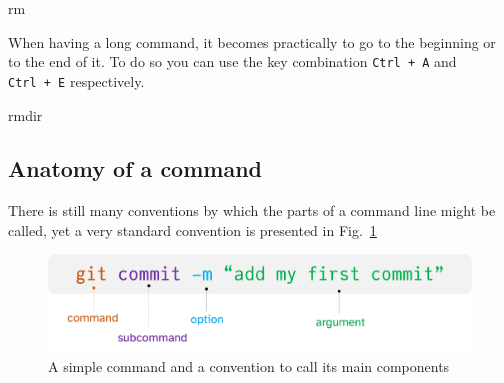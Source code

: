 \documentclass[
  letterpaper,
  DIV=11,
  numbers=noendperiod,
  oneside]{scrreprt}
\newenvironment{Shaded}{\begin{snugshade}}{\end{snugshade}}
\newcommand{\FunctionTok}[1]{\textcolor[rgb]{0.28,0.35,0.67}{#1}}
\begin{document}
\begin{Shaded}
\begin{Highlighting}[]
\FunctionTok{rm}
\end{Highlighting}
\end{Shaded}

\begin{tcolorbox}[enhanced jigsaw, opacityback=0, leftrule=.75mm, breakable, titlerule=0mm, toprule=.15mm, rightrule=.15mm, title=\textcolor{quarto-callout-tip-color}{\faLightbulb}\hspace{0.5em}{Tip}, colback=white, opacitybacktitle=0.6, toptitle=1mm, bottomtitle=1mm, colframe=quarto-callout-tip-color-frame, colbacktitle=quarto-callout-tip-color!10!white, arc=.35mm, coltitle=black, bottomrule=.15mm, left=2mm]
When having a long command, it becomes practically to go to the
beginning or to the end of it. To do so you can use the key combination
\texttt{Ctrl\ +\ A} and \texttt{Ctrl\ +\ E} respectively.
\end{tcolorbox}

\begin{Shaded}
\begin{Highlighting}[]
\FunctionTok{rmdir}
\end{Highlighting}
\end{Shaded}

\hypertarget{anatomy-of-a-command}{%
\subsection{Anatomy of a command}\label{anatomy-of-a-command}}

There is still many conventions by which the parts of a command line
might be called, yet a very standard convention is presented in
Fig.~\ref{fig-command}

\begin{figure}

{\centering \includegraphics{chs-command-line/imgs-cli/command-anatomy.png}

}

\caption{\label{fig-command}A simple command and a convention to call
its main components}

\end{figure}
\end{document}
